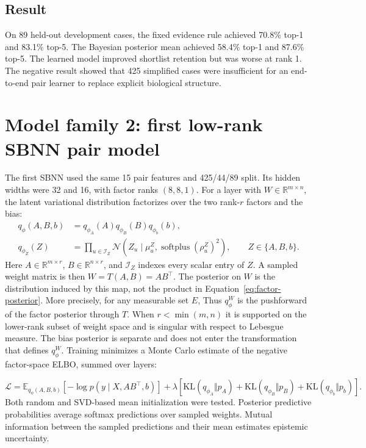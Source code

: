 \documentclass[11pt]{article}
\begin{document}
\subsection{Result}

On 89 held-out development cases, the fixed evidence rule achieved 70.8\% top-1 and 83.1\% top-5. The Bayesian posterior mean achieved 58.4\% top-1 and 87.6\% top-5. The learned model improved shortlist retention but was worse at rank 1. The negative result showed that 425 simplified cases were insufficient for an end-to-end pair learner to replace explicit biological structure.

\section{Model family 2: first low-rank SBNN pair model}

The first SBNN \citep{toure2026} used the same 15 pair features and 425/44/89 split. Its hidden widths were 32 and 16, with factor ranks $(8,8,1)$. For a layer with $W\in\mathbb{R}^{m\times n}$, the latent variational distribution factorizes over the two rank-$r$ factors and the bias:
\begin{equation}
\begin{aligned}
q_\phi(A,B,b)&=q_{\phi_A}(A)q_{\phi_B}(B)q_{\phi_b}(b),\\
q_{\phi_Z}(Z)&=\prod_{u\in\mathcal{I}_Z}
\mathcal{N}\!\left(Z_u\mid\mu^Z_u,
\operatorname{softplus}(\rho^Z_u)^2\right),
\qquad Z\in\{A,B,b\}.
\end{aligned}
\label{eq:factor-posterior}
\end{equation}
Here $A\in\mathbb{R}^{m\times r}$, $B\in\mathbb{R}^{n\times r}$, and $\mathcal{I}_Z$ indexes every scalar entry of $Z$. A sampled weight matrix is then $W=T(A,B)=AB^\top$. The posterior on $W$ is the distribution induced by this map, not the product in Equation~\ref{eq:factor-posterior}. More precisely, for any measurable set $E$,
Thus $q_\phi^W$ is the pushforward of the factor posterior through $T$. When $r<\min(m,n)$ it is supported on the lower-rank subset of weight space and is singular with respect to Lebesgue measure. The bias posterior is separate and does not enter the transformation that defines $q_\phi^W$. Training minimizes a Monte Carlo estimate of the negative factor-space ELBO, summed over layers:

\begin{equation}
\mathcal{L}=\mathbb{E}_{q_\phi(A,B,b)}[-\log p(y\mid X,AB^\top,b)]
+\lambda\!\left[
\mathrm{KL}(q_{\phi_A}\Vert p_A)+
\mathrm{KL}(q_{\phi_B}\Vert p_B)+
\mathrm{KL}(q_{\phi_b}\Vert p_b)
\right].
\label{eq:factor-elbo}
\end{equation}
Both random and SVD-based mean initialization were tested. Posterior predictive probabilities average softmax predictions over sampled weights. Mutual information between the sampled predictions and their mean estimates epistemic uncertainty.
\end{document}
